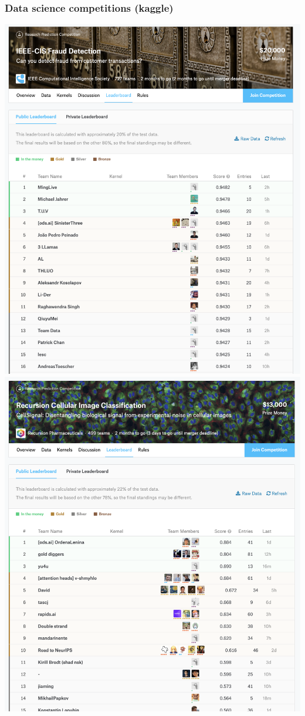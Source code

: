 \documentclass[t]{beamer}
\begin{document}
\begin{frame}
  \frametitle{Data science competitions (kaggle)}
  \vspace{-1.0\baselineskip}
    \begin{center}
      \includegraphics[scale=0.16]{kaggle1.png}
      \includegraphics[scale=0.16]{kaggle2.png}

\end{center}
\end{frame}
\end{document}
